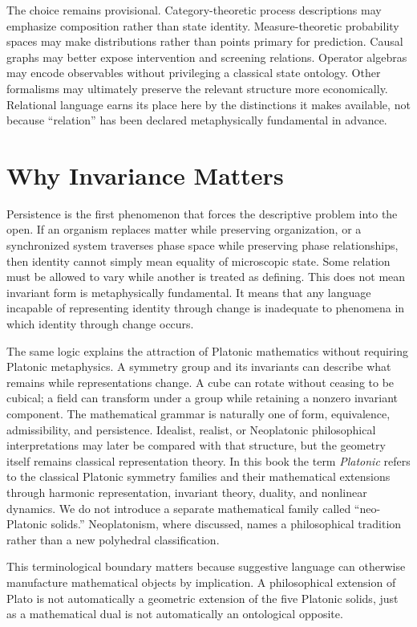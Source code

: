 The choice remains provisional. Category-theoretic process descriptions may emphasize composition rather than state identity. Measure-theoretic probability spaces may make distributions rather than points primary for prediction. Causal graphs may better expose intervention and screening relations. Operator algebras may encode observables without privileging a classical state ontology. Other formalisms may ultimately preserve the relevant structure more economically. Relational language earns its place here by the distinctions it makes available, not because ``relation'' has been declared metaphysically fundamental in advance.

\section{Why Invariance Matters}

Persistence is the first phenomenon that forces the descriptive problem into the open. If an organism replaces matter while preserving organization, or a synchronized system traverses phase space while preserving phase relationships, then identity cannot simply mean equality of microscopic state. Some relation must be allowed to vary while another is treated as defining. This does not mean invariant form is metaphysically fundamental. It means that any language incapable of representing identity through change is inadequate to phenomena in which identity through change occurs.

The same logic explains the attraction of Platonic mathematics without requiring Platonic metaphysics. A symmetry group and its invariants can describe what remains while representations change. A cube can rotate without ceasing to be cubical; a field can transform under a group while retaining a nonzero invariant component. The mathematical grammar is naturally one of form, equivalence, admissibility, and persistence. Idealist, realist, or Neoplatonic philosophical interpretations may later be compared with that structure, but the geometry itself remains classical representation theory. In this book the term \emph{Platonic} refers to the classical Platonic symmetry families and their mathematical extensions through harmonic representation, invariant theory, duality, and nonlinear dynamics. We do not introduce a separate mathematical family called ``neo-Platonic solids.'' Neoplatonism, where discussed, names a philosophical tradition rather than a new polyhedral classification.

This terminological boundary matters because suggestive language can otherwise manufacture mathematical objects by implication. A philosophical extension of Plato is not automatically a geometric extension of the five Platonic solids, just as a mathematical dual is not automatically an ontological opposite.

